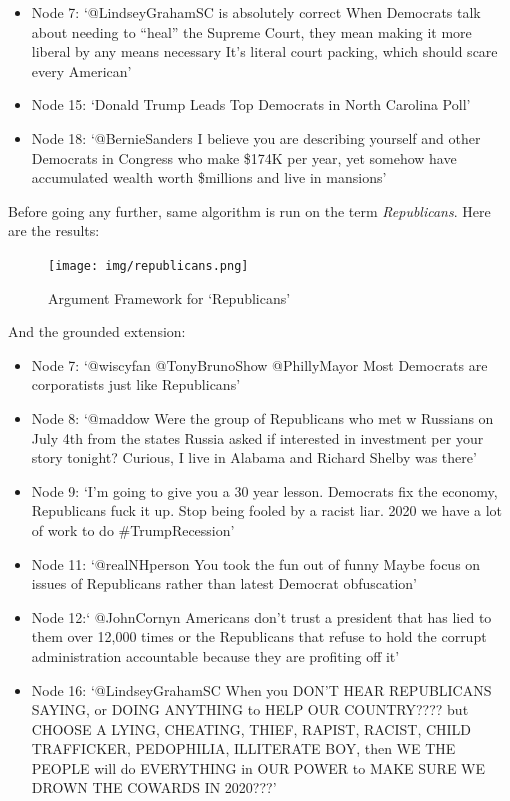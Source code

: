             \begin{itemize}
                \item Node 7: `@LindseyGrahamSC is absolutely correct  When Democrats talk about needing to ``heal'' the Supreme Court, they mean making it more liberal by any means necessary  It's literal court packing, which should scare every American'
                \item Node 15: `Donald Trump Leads Top Democrats in North Carolina Poll'
                \item Node 18: `@BernieSanders I believe you are describing yourself and other Democrats in Congress who make \$174K per year, yet somehow have accumulated wealth worth \$millions and live in mansions'
            \end{itemize}
            
            Before going any further, same algorithm is run on the term \textit{Republicans}. Here are the results:
            
            \begin{figure}[!htbp]
                \centering
                \texttt{[image: img/republicans.png]}
                \caption{Argument Framework for `Republicans'}
                \label{fig:republican}
            \end{figure}
            \FloatBarrier
            
            And the grounded extension:
            \begin{itemize}
                \item Node 7: `@wiscyfan @TonyBrunoShow @PhillyMayor Most Democrats are corporatists just like Republicans'
                \item Node 8: `@maddow Were the group of Republicans who met w Russians on July 4th from the states Russia asked if interested in investment per your story tonight? Curious, I live in Alabama and Richard Shelby was there'
                \item Node 9: `I’m going to give you a 30 year lesson. Democrats fix the economy, Republicans fuck it up. Stop being fooled by a racist liar. 2020 we have a lot of work to do \#TrumpRecession'
                \item Node 11: `@realNHperson You took the fun out of funny Maybe focus on issues of Republicans rather than latest Democrat obfuscation'
                \item Node 12:` @JohnCornyn Americans don't trust a president that has lied to them over 12,000 times or the Republicans that refuse to hold the corrupt administration accountable because they are profiting off it'
                \item Node 16: `@LindseyGrahamSC When you DON’T HEAR REPUBLICANS SAYING, or DOING ANYTHING to HELP OUR COUNTRY???? but CHOOSE A LYING, CHEATING, THIEF, RAPIST, RACIST, CHILD TRAFFICKER, PEDOPHILIA, ILLITERATE BOY, then WE THE PEOPLE will do EVERYTHING in OUR POWER to MAKE SURE WE DROWN THE COWARDS IN 2020???'
            \end{itemize}
            
